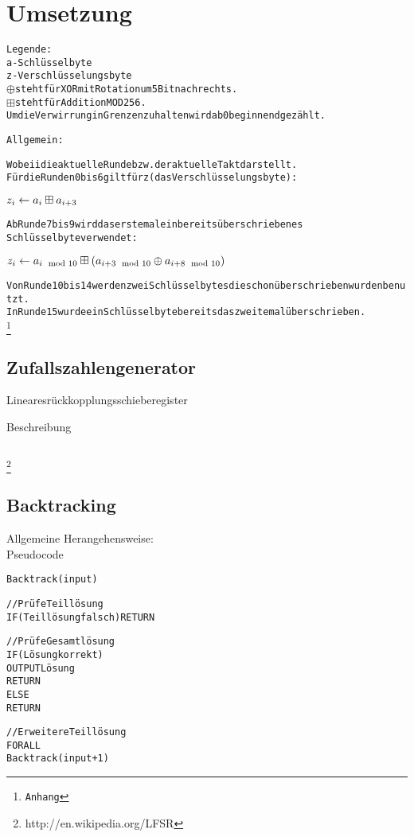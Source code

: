 \documentclass[a4paper,12pt]{article}
\begin{document}
\section{Umsetzung}

\begin{alltt}
Legende:
a - Schlüsselbyte
z - Verschlüsselungsbyte
\( \oplus \) steht für XOR mit Rotation um 5 Bit nach rechts.
\( \boxplus \) steht für Addition MOD 256.
Um die Verwirrung in Grenzen zu halten wird ab 0 beginnend gezählt.

Allgemein:

Wobei i die aktuelle Runde bzw. der aktuelle Takt darstellt.
Für die Runden 0 bis 6 gilt für z (das Verschlüsselungsbyte):

\( z\sb{i} \leftarrow a\sb{i} \boxplus a\sb{i+3} \)

Ab Runde 7 bis 9 wird das erste mal ein bereits überschriebenes 
Schlüsselbyte verwendet:

\( z\sb{i} \leftarrow a\sb{i \mod 10} \boxplus (a\sb{i+3 \mod 10} \oplus a\sb{i+8 \mod 10}) \)

Von Runde 10 bis 14 werden zwei Schlüsselbytes die schon überschrieben wurden benutzt.
In Runde 15 wurde ein Schlüsselbyte bereits das zweite mal überschrieben.
\footnote{Anhang}
\end{alltt}

\subsection{Zufallszahlengenerator}

Linearesrückkopplungsschieberegister

Beschreibung

\begin{verbatim}

\end{verbatim}

\footnote{http://en.wikipedia.org/LFSR}

\subsection{Backtracking}

Allgemeine Herangehensweise: \\
Pseudocode

\begin{alltt}
Backtrack(input) {

    //Prüfe Teillösung
    IF (Teillösung falsch) RETURN

    //Prüfe Gesamtlösung
    IF (Lösung korrekt) 
        OUTPUT Lösung
        RETURN
    ELSE 
        RETURN

    //Erweitere Teillösung
    FOR ALL
        Backtrack(input + 1)
}
\end{alltt}
\end{document}
